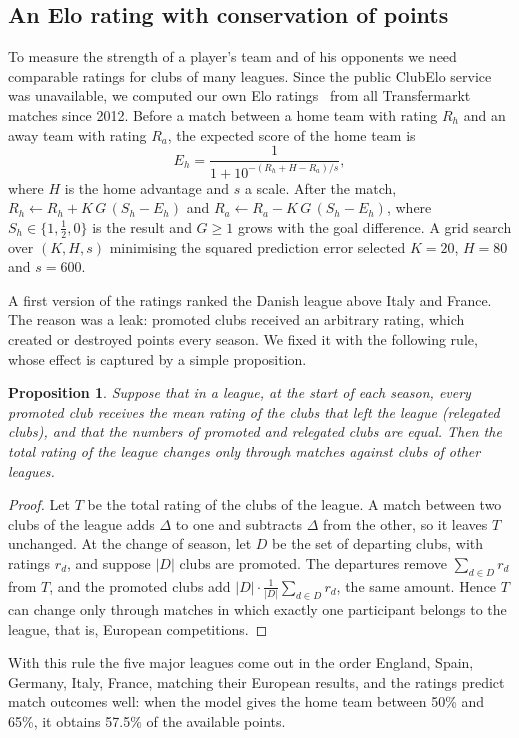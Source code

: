 \documentclass[11pt]{amsart}
\newtheorem{proposition}[theorem]{Proposition}
\theoremstyle{definition}
\theoremstyle{remark}
\begin{document}
\subsection{An Elo rating with conservation of points}
To measure the strength of a player's team and of his opponents we need comparable ratings for clubs of many leagues. Since the public ClubElo service was unavailable, we computed our own Elo ratings~\cite{elo} from all Transfermarkt matches since 2012. Before a match between a home team with rating $R_h$ and an away team with rating $R_a$, the expected score of the home team is
\[
E_h = \frac{1}{1+10^{-(R_h+H-R_a)/s}},
\]
where $H$ is the home advantage and $s$ a scale. After the match, $R_h\leftarrow R_h+K\,G\,(S_h-E_h)$ and $R_a\leftarrow R_a-K\,G\,(S_h-E_h)$, where $S_h\in\{1,\tfrac12,0\}$ is the result and $G\ge 1$ grows with the goal difference. A grid search over $(K,H,s)$ minimising the squared prediction error selected $K=20$, $H=80$ and $s=600$.

A first version of the ratings ranked the Danish league above Italy and France. The reason was a leak: promoted clubs received an arbitrary rating, which created or destroyed points every season. We fixed it with the following rule, whose effect is captured by a simple proposition.

\begin{proposition}\label{prop:elo}
Suppose that in a league, at the start of each season, every promoted club receives the mean rating of the clubs that left the league (relegated clubs), and that the numbers of promoted and relegated clubs are equal. Then the total rating of the league changes only through matches against clubs of other leagues.
\end{proposition}

\begin{proof}
Let $T$ be the total rating of the clubs of the league. A match between two clubs of the league adds $\Delta$ to one and subtracts $\Delta$ from the other, so it leaves $T$ unchanged. At the change of season, let $D$ be the set of departing clubs, with ratings $r_d$, and suppose $|D|$ clubs are promoted. The departures remove $\sum_{d\in D}r_d$ from $T$, and the promoted clubs add $|D|\cdot\frac{1}{|D|}\sum_{d\in D}r_d$, the same amount. Hence $T$ can change only through matches in which exactly one participant belongs to the league, that is, European competitions.
\end{proof}

With this rule the five major leagues come out in the order England, Spain, Germany, Italy, France, matching their European results, and the ratings predict match outcomes well: when the model gives the home team between 50\% and 65\%, it obtains 57.5\% of the available points.
\end{document}
